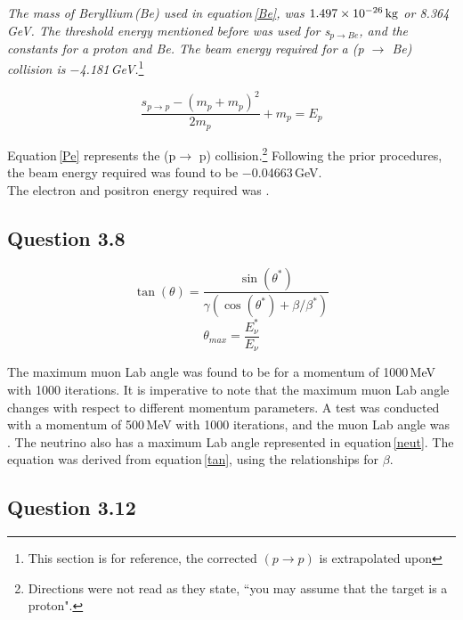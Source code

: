 \documentclass[aps,prl,twocolumn,superscriptaddress,nofootinbib]{revtex4-1}
\begin{document}
 \textit{The mass of Beryllium\,(Be) used in equation\,\ref{Be}, was $1.497\times10^{-26}\,\textnormal{kg}$ or 8.364\,GeV. The threshold energy mentioned before was used for s$_{p \rightarrow Be}$, and the constants for a proton and Be. The beam energy required for a (p $\rightarrow$ Be) collision is $-$4.181\,GeV.}\footnote{This section is for reference, the corrected $(p\rightarrow p)$ is extrapolated upon}

\begin{equation}
\frac{s_{p\rightarrow p}-(m_p+m_{p})^2}{2m_{p}}+m_p=E_p
\label{Pe}
\end{equation}

\indent Equation\,\ref{Pe} represents the (p$\rightarrow$ p) collision.\footnote{Directions were not read as they state,  ``you may assume that the target is a proton".} Following the prior procedures, the beam energy required was found to be $-$0.04663\,GeV.
\\
\indent The electron and positron energy required was .


\subsection{Question 3.8}

\begin{equation}
\tan(\theta)=\frac{\sin(\theta^*)}{\gamma(\cos(\theta^*)+\beta/\beta^*)}
\label{tan}
\end{equation}
\begin{equation}
\theta_{max}=\frac{E^*_\nu}{E_\nu}
\label{neut}
\end{equation}

The maximum muon Lab angle was found to be \boxed{135\degree} for a momentum of 1000\,MeV with 1000 iterations. It is imperative to note that the maximum muon Lab angle changes with respect to different momentum parameters. A test was conducted with a momentum of 500\,MeV with 1000 iterations, and the muon Lab angle was \boxed{150\degree}.  The neutrino also has a maximum Lab angle represented in equation\,\ref{neut}. The equation was derived from equation\,\ref{tan}, using the relationships for $\beta$.

\subsection{Question 3.12}
\end{document}
